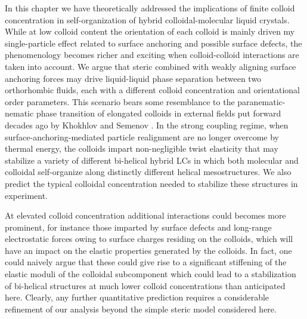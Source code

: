 In this chapter we have theoretically addressed the implications of finite colloid concentration in self-organization of hybrid colloidal-molecular liquid crystals. While at low colloid content the orientation of each colloid is mainly driven my single-particle effect related to surface anchoring and possible surface defects, the phenomenology becomes richer and exciting when colloid-colloid interactions are taken into account. We argue that steric combined with weakly aligning surface anchoring forces may drive liquid-liquid phase separation between two orthorhombic fluids, each with a different colloid concentration and orientational order parameters. This scenario bears some resemblance to the paranematic-nematic phase transition of elongated colloids in external fields put forward decades ago by Khokhlov and Semenov \cite{khokhlov1982influence}. In the strong coupling regime, when surface-anchoring-mediated  particle realignment are no longer overcome by thermal energy, the colloids impart non-negligible twist elasticity that may stabilize a variety of different bi-helical hybrid LCs in which both molecular and colloidal self-organize along distinctly different helical mesostructures. We also predict the typical colloidal concentration needed to stabilize these structures in experiment. 

At elevated colloid concentration additional interactions could becomes more prominent, for instance those imparted by surface defects and long-range electrostatic forces owing to surface charges residing on the colloids, which will have an impact on the elastic properties generated by the colloids. In fact, one could naively argue  that these could give rise to a significant stiffening of the elastic moduli of the colloidal subcomponent which could lead to a stabilization of bi-helical structures at much lower colloid concentrations than anticipated here.   Clearly, any further quantitative prediction requires a considerable refinement of our analysis beyond the simple steric model considered here.  













